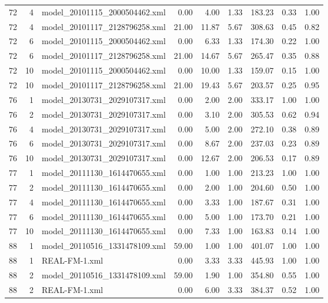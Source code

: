 \begin{table}[ht]
\begin{tabular}{rrlrrrrrr}
   72 &   4 & model\_20101115\_2000504462.xml & 0.00 & 4.00 & 1.33 & 183.23 & 0.33 & 1.00 \\ 
   72 &   4 & model\_20101117\_2128796258.xml & 21.00 & 11.87 & 5.67 & 308.63 & 0.45 & 0.82 \\ 
   72 &   6 & model\_20101115\_2000504462.xml & 0.00 & 6.33 & 1.33 & 174.30 & 0.22 & 1.00 \\ 
   72 &   6 & model\_20101117\_2128796258.xml & 21.00 & 14.67 & 5.67 & 265.47 & 0.35 & 0.88 \\ 
   72 &  10 & model\_20101115\_2000504462.xml & 0.00 & 10.00 & 1.33 & 159.07 & 0.15 & 1.00 \\ 
   72 &  10 & model\_20101117\_2128796258.xml & 21.00 & 19.43 & 5.67 & 203.57 & 0.25 & 0.95 \\ 
   76 &   1 & model\_20130731\_2029107317.xml & 0.00 & 2.00 & 2.00 & 333.17 & 1.00 & 1.00 \\ 
   76 &   2 & model\_20130731\_2029107317.xml & 0.00 & 3.10 & 2.00 & 305.53 & 0.62 & 0.94 \\ 
   76 &   4 & model\_20130731\_2029107317.xml & 0.00 & 5.00 & 2.00 & 272.10 & 0.38 & 0.89 \\ 
   76 &   6 & model\_20130731\_2029107317.xml & 0.00 & 8.67 & 2.00 & 237.03 & 0.23 & 0.89 \\ 
   76 &  10 & model\_20130731\_2029107317.xml & 0.00 & 12.67 & 2.00 & 206.53 & 0.17 & 0.89 \\ 
   77 &   1 & model\_20111130\_1614470655.xml & 0.00 & 1.00 & 1.00 & 213.23 & 1.00 & 1.00 \\ 
   77 &   2 & model\_20111130\_1614470655.xml & 0.00 & 2.00 & 1.00 & 204.60 & 0.50 & 1.00 \\ 
   77 &   4 & model\_20111130\_1614470655.xml & 0.00 & 3.33 & 1.00 & 187.67 & 0.31 & 1.00 \\ 
   77 &   6 & model\_20111130\_1614470655.xml & 0.00 & 5.00 & 1.00 & 173.70 & 0.21 & 1.00 \\ 
   77 &  10 & model\_20111130\_1614470655.xml & 0.00 & 7.33 & 1.00 & 163.83 & 0.14 & 1.00 \\ 
   88 &   1 & model\_20110516\_1331478109.xml & 59.00 & 1.00 & 1.00 & 401.07 & 1.00 & 1.00 \\ 
   88 &   1 & REAL-FM-1.xml & 0.00 & 3.33 & 3.33 & 445.93 & 1.00 & 1.00 \\ 
   88 &   2 & model\_20110516\_1331478109.xml & 59.00 & 1.90 & 1.00 & 354.80 & 0.55 & 1.00 \\ 
   88 &   2 & REAL-FM-1.xml & 0.00 & 6.00 & 3.33 & 384.37 & 0.52 & 1.00 \\ 

\end{tabular}
\end{table}
